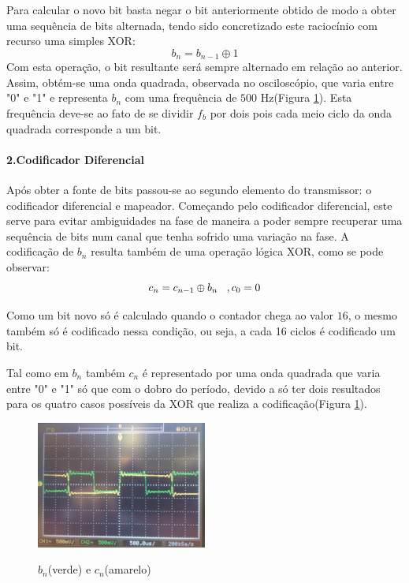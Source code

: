 \documentclass[11pt]{article}
\numberwithin{equation}{section}
\begin{document}
Para calcular o novo bit basta negar o bit anteriormente obtido de modo a obter uma sequência de bits alternada, tendo sido concretizado este raciocínio com recurso uma simples XOR:
\begin{equation}
b_n=b_{n-1} \oplus 1
\end{equation}
Com esta operação, o bit resultante será sempre alternado em relação ao anterior.
Assim, obtém-se uma onda quadrada, observada no osciloscópio, que varia entre "0" e "1" e representa $ b_n $  com uma frequência de $500$ Hz(Figura \ref{bn_cn}). Esta frequência deve-se ao fato de se dividir  $f_b$ por dois pois cada meio ciclo da onda quadrada corresponde a um bit.  

\paragraph{2.Codificador Diferencial} \hspace{0pt} \label{para:P2-2}

Após obter a fonte de bits passou-se ao segundo elemento do transmissor: o codificador diferencial e mapeador. Começando pelo codificador diferencial, este serve para evitar ambiguidades na fase de maneira a poder sempre recuperar uma sequência de bits num canal que tenha sofrido uma variação na fase.
A codificação de $b_n$ resulta também de uma operação lógica XOR, como se pode observar: 
\begin{equation}
c_n=c_{n-1} \oplus b_n \hspace{3 mm} ,c_0=0
\end{equation}

Como um bit novo só é calculado quando o contador chega ao valor $16$, o mesmo também só é codificado nessa condição, ou seja, a cada 16 ciclos é codificado um bit. 

Tal como em $ b_n $ também $ c_n $ é representado por uma onda quadrada que varia entre "0" e "1" só que com o dobro do período, devido a só ter dois resultados para os quatro casos possíveis da XOR que realiza a codificação(Figura \ref{bn_cn}).
\begin{figure}[H]
	\centering
	\includegraphics[width=0.5\textwidth]{./bn_cn}~\\
	\caption{$ b_n $(verde) e $ c_n $(amarelo)}
	\label{bn_cn}
\end{figure}
\end{document}

